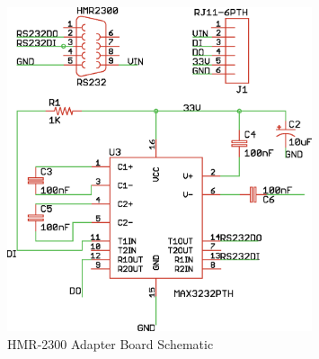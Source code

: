 \newpage
\begin{figure}[h!]
  \caption{HMR-2300 Adapter Board Schematic} \label{hmr2300Schematic}
  \centering
    \includegraphics[width=0.8\textwidth]{figures/magBoard.eps}
\end{figure}